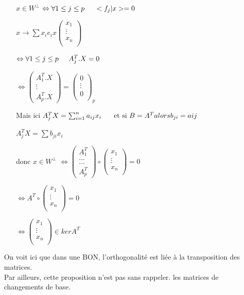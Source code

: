 \documentclass{article}
\newcommand\tab[1][1cm]{\hspace*{#1}}
\begin{document}
\begin{itemize}
    \item[$x \in W^\perp$] $\Leftrightarrow \forall 1 \leq j \leq p \tab[0.5cm] <f_j | x> = 0$
    \item[] $x \rightarrow \sum x_i e_i x \begin{pmatrix}
        x_1\\
        \vdots\\
        x_n\\
    \end{pmatrix}$
    \item[] $\Leftrightarrow \forall 1 \leq j \leq p \tab[0.5cm] A_j^T . X = 0$
    \item[] $\Leftrightarrow \begin{pmatrix}
        A_1^T . X\\
        \vdots\\
        A_p^T . X
    \end{pmatrix} = \begin{pmatrix}
        0\\
        \vdots\\
        0\\
    \end{pmatrix}_p$
    \item[Mais ici] $A_j^T X = \sum_{i = 1}^n a_{ij} x_i \tab[0.5cm] \mbox{ et si } B = A^T alors b_{ji} = a{ij}$
    \item[] $A_j^T X = \sum b_{ji} x_i$
    \item[donc $x \in W^\perp$] $\Leftrightarrow \begin{pmatrix}
        A_1^T\\
        \dots\\
        \dots\\
        A_p^T
    \end{pmatrix} \circ \begin{pmatrix}
        x_1\\
        \vdots\\
        x_n\\
    \end{pmatrix} = 0$
    \item[] $\Leftrightarrow A^T \circ \begin{pmatrix}
        x_1\\
        \vdots\\
        x_n\\
    \end{pmatrix} = 0$
    \item[] $\Leftrightarrow \begin{pmatrix}
        x_1\\
        \vdots\\
        x_n\\
    \end{pmatrix} \in ker A^T$
\end{itemize}
On voit ici que dans une BON, l'orthogonalité est liée à la transposition des matrices.\\
Par ailleurs, cette proposition n'est pas sans rappeler. les matrices de changements de base.\\
\end{document}
